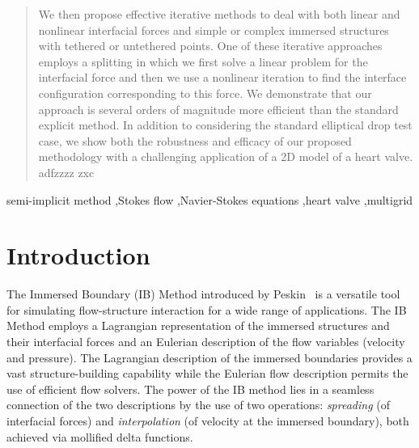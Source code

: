 \documentclass[preprint,12pt]{elsarticle}
\begin{document}
\begin{frontmatter}
\begin{abstract}
We then propose effective iterative methods to deal with both linear and nonlinear interfacial forces and simple or complex immersed structures with tethered or untethered points.  One of these iterative approaches employs a splitting in which 
we first solve a linear problem  for the interfacial force and then we use a nonlinear iteration to find the interface configuration corresponding to this force.  We demonstrate that our approach is several orders of magnitude more efficient than the standard explicit method. In addition to considering the standard elliptical drop test case, we show both the robustness and efficacy of our proposed methodology with a challenging application of a 2D model of a heart valve.
adfzzzz zxc  
\end{abstract}

\begin{keyword}
semi-implicit method \sep Stokes flow \sep Navier-Stokes equations \sep heart valve \sep multigrid


\end{keyword}

\end{frontmatter}

\section{Introduction}
The Immersed Boundary (IB) Method introduced by Peskin~\cite{Peskin77} is a versatile tool for simulating flow-structure interaction for a wide range of applications.  The IB Method employs a Lagrangian representation of 
the immersed structures and their interfacial forces and an Eulerian description of the 
flow variables (velocity and pressure).  The Lagrangian description of the immersed boundaries provides a vast structure-building capability while the Eulerian flow description permits the use of efficient flow solvers.
The power of the IB method lies in a seamless connection of the two descriptions by the use of two operations: 
{\em spreading} (of interfacial forces) and {\em interpolation} (of velocity at the immersed boundary), both achieved via mollified delta functions. 
  
\end{document}
